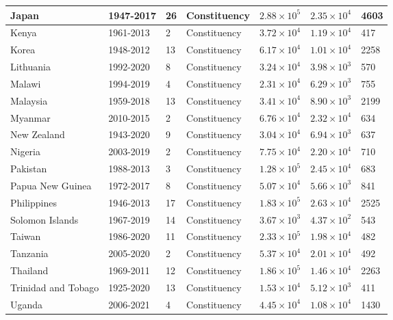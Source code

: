 \begin{table}[h]
{\begin{tabular}{|l|l|l|l|l|l|l|}
    Japan & 1947-2017 & 26 & Constituency & $2.88\times 10^{5}$ & $2.35\times 10^{4}$ & 4603\\ \hline
    Kenya & 1961-2013 & 2 & Constituency & $3.72\times 10^{4}$ & $1.19\times 10^{4}$ & 417\\ \hline
    Korea & 1948-2012 & 13 & Constituency & $6.17\times 10^{4}$ & $1.01\times 10^{4}$ & 2258\\ \hline
    Lithuania & 1992-2020 & 8 & Constituency & $3.24\times 10^{4}$ & $3.98\times 10^{3}$ & 570\\ \hline
    Malawi & 1994-2019 & 4 & Constituency & $2.31\times 10^{4}$ & $6.29\times 10^{3}$ & 755\\ \hline
    Malaysia & 1959-2018 & 13 & Constituency & $3.41\times 10^{4}$ & $8.90\times 10^{3}$ & 2199\\ \hline
    Myanmar & 2010-2015 & 2 & Constituency & $6.76\times 10^{4}$ & $2.32\times 10^{4}$ & 634\\ \hline
    New Zealand & 1943-2020 & 9 & Constituency & $3.04\times 10^{4}$ & $6.94\times 10^{3}$ & 637\\ \hline
    Nigeria & 2003-2019 & 2 & Constituency & $7.75\times 10^{4}$ & $2.20\times 10^{4}$ & 710\\ \hline
    Pakistan & 1988-2013 & 3 & Constituency & $1.28\times 10^{5}$ & $2.45\times 10^{4}$ & 683\\ \hline
    Papua New Guinea & 1972-2017 & 8 & Constituency & $5.07\times 10^{4}$ & $5.66\times 10^{3}$ & 841\\ \hline
    Philippines & 1946-2013 & 17 & Constituency & $1.83\times 10^{5}$ & $2.63\times 10^{4}$ & 2525\\ \hline
    Solomon Islands & 1967-2019 & 14 & Constituency & $3.67\times 10^{3}$ & $4.37\times 10^{2}$ & 543\\ \hline
    Taiwan & 1986-2020 & 11 & Constituency & $2.33\times 10^{5}$ & $1.98\times 10^{4}$ & 482\\ \hline
    Tanzania & 2005-2020 & 2 & Constituency & $5.37\times 10^{4}$ & $2.01\times 10^{4}$ & 492\\ \hline
    Thailand & 1969-2011 & 12 & Constituency & $1.86\times 10^{5}$ & $1.46\times 10^{4}$ & 2263\\ \hline
    Trinidad and Tobago & 1925-2020 & 13 & Constituency & $1.53\times 10^{4}$ & $5.12\times 10^{3}$ & 411\\ \hline
    Uganda & 2006-2021 & 4 & Constituency & $4.45\times 10^{4}$ & $1.08\times 10^{4}$ & 1430\\ \hline

\end{tabular}}
\end{table}
